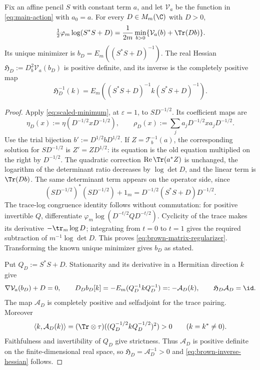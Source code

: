 \begin{lemma}\label{lem:brown-matrix-regularizer}
Fix an affine pencil $S$ with constant term $a$, and let $\mathcal V_a$ be the function in \eqref{eq:main-action} with $a_0=a$.
For every $D\in M_m(\C)$ with $D>0$,
\begin{equation}\label{eq:brown-matrix-regularizer}
 \tfrac12\varphi_m\log(S^*S+D)
 =\frac1{2m}\min_{b>0}\{\mathcal V_a(b)+\Tr(Db)\}.
\end{equation}
Its unique minimizer is $b_D=E_m((S^*S+D)^{-1})$.
The real Hessian $\mathfrak H_D:=D_b^2\mathcal V_a(b_D)$ is positive definite, and its inverse is the completely positive map
\begin{equation}\label{eq:brown-inverse-hessian}
 \mathfrak H_D^{-1}(k)
 =E_m((S^*S+D)^{-1}k(S^*S+D)^{-1}).
\end{equation}
\end{lemma}
\begin{proof}
Apply \eqref{eq:scaled-minimum}, at $\varepsilon=1$, to $SD^{-1/2}$.
Its coefficient maps are
\[
 \eta_D(x):=\eta(D^{-1/2}xD^{-1/2}),\qquad
 \rho_D(x):=\sum_j a_jD^{-1/2}xa_jD^{-1/2}.
\]
Use the trial bijection $b':=D^{1/2}bD^{1/2}$.
If $Z=\mathcal T_b^{-1}(a)$, the corresponding solution for $SD^{-1/2}$ is $Z'=ZD^{1/2}$: its equation is the old equation multiplied on the right by $D^{-1/2}$.
The quadratic correction $\operatorname{Re}\Tr(a^*Z)$ is unchanged, the logarithm of the determinant ratio decreases by $\log\det D$, and the linear term is $\Tr(Db)$.
The same determinant term appears on the operator side, since
\[
 (SD^{-1/2})^*(SD^{-1/2})+1_m
   =D^{-1/2}(S^*S+D)D^{-1/2}.
\]
The trace-log congruence identity follows without commutation: for positive invertible $Q$, differentiate $\varphi_m\log(D^{-t/2}QD^{-t/2})$.
Cyclicity of the trace makes its derivative $-\tr_m\log D$; integrating from $t=0$ to $t=1$ gives the required subtraction of $m^{-1}\log\det D$.
This proves \eqref{eq:brown-matrix-regularizer}.
Transforming the known unique minimizer gives $b_D$ as stated.

Put $Q_D:=S^*S+D$.
Stationarity and its derivative in a Hermitian direction $k$ give
\[
 \nabla\mathcal V_a(b_D)+D=0,\qquad
 D_Db_D[k]=-E_m(Q_D^{-1}kQ_D^{-1})=:-\mathcal A_D(k),
 \qquad \mathfrak H_D\mathcal A_D=\id.
\]
The map $\mathcal A_D$ is completely positive and selfadjoint for the trace pairing.
Moreover
\[
 \langle k,\mathcal A_D(k)\rangle
  =(\Tr\otimes\tau)
       ((Q_D^{-1/2}kQ_D^{-1/2})^2)>0
       \qquad(k=k^*\ne0).
\]
Faithfulness and invertibility of $Q_D$ give strictness.
Thus $\mathcal A_D$ is positive definite on the finite-dimensional real space, so $\mathfrak H_D=\mathcal A_D^{-1}>0$ and \eqref{eq:brown-inverse-hessian} follows.
\end{proof}

